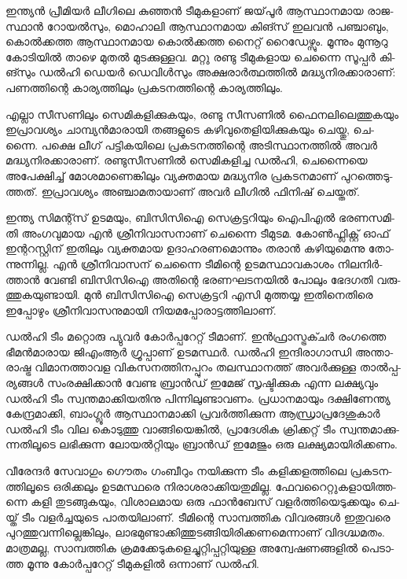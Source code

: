 \vskip 2pt

ഇ­ന്ത്യന്‍ പ്രീ­മി­യര്‍ ലീ­ഗി­ലെ കു­ഞ്ഞന്‍ ടീ­മു­ക­ളാ­ണ് ജയ്‌­പൂര്‍ ആസ്ഥാ­ന­മായ രാ­ജ­സ്ഥാന്‍ റോ­യല്‍­സും, മൊ­ഹാ­ലി 
ആസ്ഥാ­ന­മായ കി­ങ്സ് ഇല­വന്‍ പഞ്ചാ­ബും, കൊല്‍­ക്ക­ത്ത ആസ്ഥാ­ന­മായ കൊല്‍­ക്ക­ത്ത നൈ­റ്റ് റൈ­ഡേ­ഴ്സും. 
മൂ­ന്നും മു­ന്നൂ­റു കോ­ടി­യില്‍ താ­ഴെ മു­തല്‍ മു­ട­ക്കു­ള്ള­വ. മറ്റു രണ്ടു ടീ­മു­ക­ളായ ചെ­ന്നൈ സൂ­പ്പര്‍ കി­ങ്സും ഡല്‍­ഹി ഡെ­യര്‍ 
ഡെ­വിള്‍­സും അക്ഷ­രാര്‍­ത്ഥ­ത്തില്‍ മദ്ധ്യ­നി­ര­ക്കാ­രാ­ണ്: പണ­ത്തി­ന്റെ കാ­ര്യ­ത്തി­ലും പ്ര­ക­ട­ന­ത്തി­ന്റെ കാ­ര്യ­ത്തി­ലും­.

എ­ല്ലാ സീ­സ­ണി­ലും സെ­മി­ക­ളി­ക്കു­ക­യും, രണ്ടു സീ­സ­ണില്‍ ഫൈ­ന­ലി­ലെ­ത്തു­ക­യും ഇപ്രാ­വ­ശ്യം ചാ­മ്പ്യന്‍­മാ­രാ­യി തങ്ങ­ളു­ടെ 
കഴി­വു­തെ­ളി­യി­ക്കു­ക­യും ചെ­യ്തു, ചെ­ന്നൈ. പക്ഷെ ലീ­ഗ് പട്ടി­ക­യി­ലെ പ്ര­ക­ട­ന­ത്തി­ന്റെ അടി­സ്ഥാ­ന­ത്തില്‍ അവര്‍ 
മദ്ധ്യ­നി­ര­ക്കാ­രാ­ണ്. രണ്ടു­സീ­സ­ണില്‍ സെ­മി­ക­ളി­ച്ച ഡല്‍­ഹി, ചെ­ന്നൈ­യെ അപേ­ക്ഷി­ച്ച് മോ­ശ­മാ­ണെ­ങ്കി­ലും വ്യ­ക്ത­മായ 
മദ്ധ്യ­നിര പ്ര­ക­ട­ന­മാ­ണ് പു­റ­ത്തെ­ടു­ത്ത­ത്. ഇപ്രാ­വ­ശ്യം അഞ്ചാ­മ­താ­യാ­ണ് അവര്‍ ലീ­ഗില്‍ ഫി­നി­ഷ് ചെ­യ്ത­ത്.

ഇ­ന്ത്യ സി­മ­ന്റ്സ് ഉട­മ­യും, ­ബി­സി­സി­ഐ­ സെ­ക്ര­ട്ട­റി­യും ഐപി­എല്‍ ഭര­ണ­സ­മി­തി അം­ഗ­വു­മായ എന്‍ ശ്രീ­നി­വാ­സ­നാ­ണ് 
ചെ­ന്നൈ ടീ­മു­ട­മ. കോണ്‍­ഫ്ലി­ക്റ്റ് ഓഫ് ഇന്റ­റ­സ്റ്റി­ന് ഇതി­ലും വ്യ­ക്ത­മായ ഉദാ­ഹ­ര­ണ­മൊ­ന്നും തരാന്‍ കഴി­യു­മെ­ന്നു തോ­ന്നു­ന്നി­ല്ല.
എന്‍ ശ്രീ­നി­വാ­സ­ന് ചെ­ന്നൈ ടീ­മിന്റെ ഉട­മ­സ്ഥാ­വ­കാ­ശം നി­ല­നിര്‍­ത്താന്‍ വേ­ണ്ടി ബി­സി­സിഐ അതി­ന്റെ ഭര­ണ­ഘ­ട­ന­യില്‍ 
പോ­ലും ഭേ­ദ­ഗ­തി വരു­ത്തു­ക­യു­ണ്ടാ­യി. മുന്‍ ബി­സി­സിഐ സെ­ക്ര­ട്ട­റി എസി മു­ത്ത­യ്യ ഇതി­നെ­തി­രെ ഇപ്പോ­ഴും ശ്രീ­നി­വാ­സ­നു­മാ­യി 
നി­യ­മ­പ്പോ­രാ­ട്ട­ത്തി­ലാ­ണ്.

­ഡല്‍­ഹി ടീം മറ്റൊ­രു പ്യു­വര്‍ കോര്‍­പ്പ­റേ­റ്റ് ടീ­മാ­ണ്. ഇന്‍­ഫ്രാ­സ്ട്ര­ക്ചര്‍ രം­ഗ­ത്തെ ഭീ­മന്‍­മാ­രായ ജി­എം­ആര്‍ ഗ്രൂ­പ്പാ­ണ് ഉട­മ­സ്ഥര്‍. 
ഡല്‍­ഹി ഇന്ദി­രാ­ഗാ­ന്ധി അന്താ­രാ­ഷ്ട്ര വി­മാ­ന­ത്താ­വള വി­ക­സ­ന­ത്തി­ന­പ്പു­റം തല­സ്ഥാ­ന­ത്ത് അവര്‍­ക്കു­ള്ള താല്‍­പ്പ­ര്യ­ങ്ങള്‍ 
സം­ര­ക്ഷി­ക്കാന്‍ വേ­ണ്ട ബ്രാന്‍­ഡ് ഇമേ­ജ് സൃ­ഷ്ടി­ക്കുക എന്ന ലക്ഷ്യ­വും ഡല്‍­ഹി ടീം സ്വ­ന്ത­മാ­ക്കി­യ­തി­നു പി­ന്നി­ലു­ണ്ടാ­വ­ണം. 
പ്ര­ധാ­ന­മാ­യും ദക്ഷി­ണേ­ന്ത്യ കേ­ന്ദ്ര­മാ­ക്കി, ബാം­ഗ്ലൂര്‍ ആസ്ഥാ­ന­മാ­ക്കി പ്ര­വര്‍­ത്തി­ക്കു­ന്ന ആന്ധ്രാ­പ്ര­ദേ­ശു­കാര്‍ ഡല്‍­ഹി ടീം വില 
കൊ­ടു­ത്തു വാ­ങ്ങി­യെ­ങ്കില്‍, പ്രാ­ദേ­ശിക ­ക്രി­ക്ക­റ്റ് ടീം സ്വ­ന്ത­മാ­ക്കു­ന്ന­തി­ലൂ­ടെ ലഭി­ക്കു­ന്ന ലോ­യല്‍­റ്റി­യും ബ്രാന്‍­ഡ് ഇമേ­ജും ഒരു 
ലക്ഷ്യ­മാ­യി­രി­ക്ക­ണം­.

­വീ­രേ­ന്ദര്‍ സേ­വാ­ഗും ഗൌ­തം ഗം­ബീ­റും നയി­ക്കു­ന്ന ടീം കളി­ക്ക­ള­ത്തി­ലെ പ്ര­ക­ട­ന­ത്തി­ലൂ­ടെ ഒരി­ക്ക­ലും ഉട­മ­സ്ഥ­രെ 
നി­രാ­ശ­രാ­ക്കി­യ­തു­മി­ല്ല. ഫേ­വ­റൈ­റ്റു­ക­ളാ­യി­ത്ത­ന്നെ കളി തു­ട­ങ്ങു­ക­യും, വി­ശാ­ല­മായ ഒരു ഫാന്‍­ബേ­സ് വളര്‍­ത്തി­യെ­ടു­ക്ക­യും 
ചെ­യ്ത് ടീം വളര്‍­ച്ച­യു­ടെ പാ­ത­യി­ലാ­ണ്. ടീ­മി­ന്റെ സാ­മ്പ­ത്തിക വി­വ­ര­ങ്ങള്‍ ഇതു­വ­രെ പു­റ­ത്തു­വ­ന്നി­ല്ലെ­ങ്കി­ലും, 
ലാ­ഭ­മു­ണ്ടാ­ക്കി­ത്തു­ട­ങ്ങി­യി­രി­ക്ക­ണ­മെ­ന്നാ­ണ് വി­ദ­ഗ്ദ്ധ­മ­തം. മാ­ത്ര­മ­ല്ല, സാ­മ്പ­ത്തിക ക്ര­മ­ക്കേ­ടു­ക­ളെ­ച്ചു­റ്റി­പ്പ­റ്റി­യു­ള്ള 
അന്വേ­ഷ­ണ­ങ്ങ­ളില്‍ പെ­ടാ­ത്ത മൂ­ന്നു കോര്‍­പ്പ­റേ­റ്റ് ടീ­മു­ക­ളില്‍ ഒന്നാ­ണ് ഡല്‍­ഹി­.

